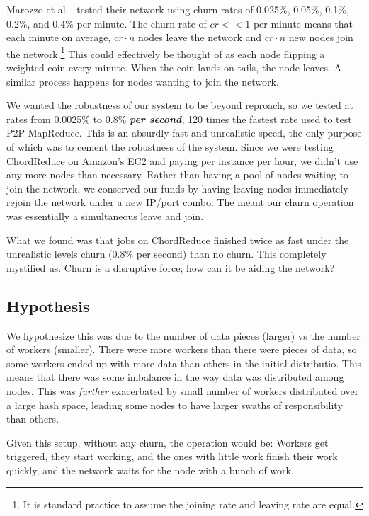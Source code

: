 Marozzo et al.\ \cite{marozzo2012p2p} tested their network using churn rates of 0.025\%, 0.05\%, 0.1\%, 0.2\%, and 0.4\% per minute.
The churn rate of $cr << 1$ per minute means that each minute on average, $cr \cdot n$ nodes leave the network and $cr \cdot n$  new nodes join the network.\footnote{It is standard practice to assume the joining rate and leaving rate are equal.}
This could effectively be thought of as each node flipping a weighted coin every minute.
When the coin lands on tails, the node leaves.
A similar process happens for nodes wanting to join the network.

We wanted the robustness of our system to be beyond reproach, so we tested at rates from 0.0025\% to 0.8\% \textbf{\textit{per second}}, 120 times the fastest rate used to test P2P-MapReduce.
This is an absurdly fast and unrealistic speed, the only purpose of which was to cement the robustness of the system.
Since we were testing ChordReduce on Amazon's EC2 and paying per instance per hour, we didn't use any more nodes than necessary.
Rather than having a pool of nodes waiting to join the network, we conserved our funds by having leaving nodes immediately rejoin the network under a new IP/port combo.
The meant our churn operation was essentially a simultaneous leave and join.


What we found was that jobs on ChordReduce finished twice as fast under the unrealistic levels churn (0.8\% per second) than no churn.
This completely mystified us. 
Churn is a disruptive force; how can it be aiding the network?

\subsection{Hypothesis}
We hypothesize this was due to the number of data pieces (larger) vs the number of workers (smaller).
There were more workers than there were pieces of data, so some workers ended up with more data than others in the initial distributio.
This means that there was some imbalance in the way data was distributed among nodes.
This was \textit{further} exacerbated by small number of workers distributed over a large hash space, leading some nodes to have larger swaths of responsibility than others.

Given this setup, without any churn, the operation would be:
Workers get triggered, they start working, and the ones with little work finish their work quickly, and the network waits for the node with a bunch of work.

